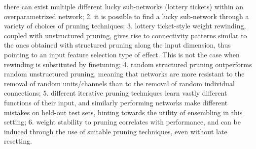 \documentclass{article}
\begin{document}
there can exist multiple different lucky sub-networks (lottery tickets) within an overparametrized network;
2. it is possible to find a lucky sub-network through a variety of choices of pruning techniques;
3. lottery ticket-style weight rewinding, coupled with unstructured pruning, gives rise to connectivity patterns similar to the ones obtained with structured pruning along the input dimension, thus pointing to an input feature selection type of effect. This is not the case when
rewinding is substituted by finetuning;
4. random structured pruning outperforms random unstructured pruning, meaning that networks are more resistant to the removal of random units/channels than to the removal of
random individual connections;
5. different iterative pruning techniques learn vastly different functions of their input, and similarly performing networks make different mistakes on held-out test sets, hinting towards
the utility of ensembling in this setting;
6. weight stability to pruning correlates with performance, and can be induced through the
use of suitable pruning techniques, even without late resetting.
\end{document}
